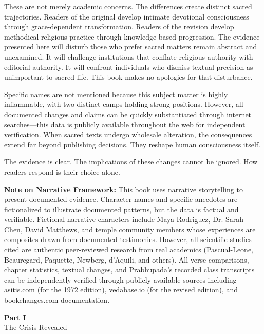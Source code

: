 \documentclass[12pt,twoside]{book}
\makeatletter
\def\cleardoublepage{\clearpage\if@twoside \ifodd\c@page\else\hbox{}\thispagestyle{empty}\newpage\if@twocolumn\hbox{}\newpage\fi\fi\fi}
\makeatother
\begin{document}
These are not merely academic concerns. The differences create distinct sacred trajectories. Readers of the original develop intimate devotional consciousness through grace-dependent transformation. Readers of the revision develop methodical religious practice through knowledge-based progression. The evidence presented here will disturb those who prefer sacred matters remain abstract and unexamined. It will challenge institutions that conflate religious authority with editorial authority. It will confront individuals who dismiss textual precision as unimportant to sacred life. This book makes no apologies for that disturbance.

Specific names are not mentioned because this subject matter is highly inflammable, with two distinct camps holding strong positions. However, all documented changes and claims can be quickly substantiated through internet searches—this data is publicly available throughout the web for independent verification. When sacred texts undergo wholesale alteration, the consequences extend far beyond publishing decisions. They reshape human consciousness itself.

The evidence is clear. The implications of these changes cannot be ignored. How readers respond is their choice alone.

\textbf{\textbf{Note on Narrative Framework:}} This book uses narrative storytelling to present documented evidence. Character names and specific anecdotes are fictionalized to illustrate documented patterns, but the data is factual and verifiable. Fictional narrative characters include Maya Rodriguez, Dr. Sarah Chen, David Matthews, and temple community members whose experiences are composites drawn from documented testimonies. However, all scientific studies cited are authentic peer-reviewed research from real academics (Pascual-Leone, Beauregard, Paquette, Newberg, d'Aquili, and others). All verse comparisons, chapter statistics, textual changes, and Prabhupāda's recorded class transcripts can be independently verified through publicly available sources including asitis.com (for the 1972 edition), vedabase.io (for the revised edition), and bookchanges.com documentation.

\clearpage
\pagestyle{empty}
\vspace*{0.20\textheight}
\begin{center}
{\Huge\bfseries Part I}\\[0.5cm]
{\Large The Crisis Revealed}
\end{center}
\vspace*{\fill}
\cleardoublepage
\pagestyle{fancy}
\vspace*{0.20\textheight}
\end{document}
